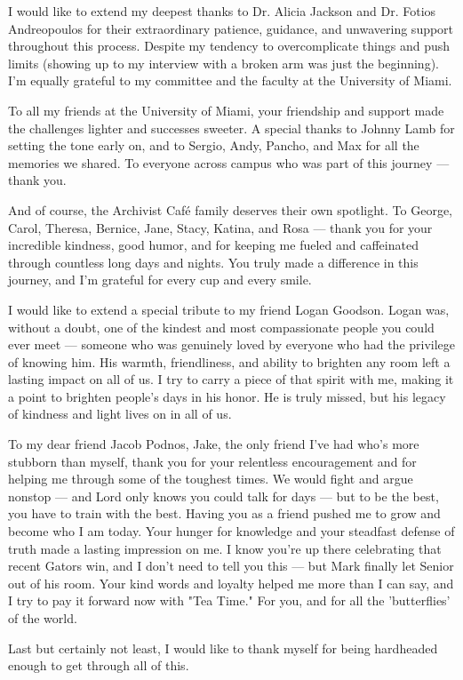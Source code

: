 \begin{dissacknowledgments}
I would like to extend my deepest thanks to Dr. Alicia Jackson and Dr. Fotios Andreopoulos for their extraordinary patience, guidance, and unwavering support throughout this process. Despite my tendency to overcomplicate things and push limits (showing up to my interview with a broken arm was just the beginning). I'm equally grateful to my committee and the faculty at the University of Miami. 
    
To all my friends at the University of Miami, your friendship and support made the challenges lighter and successes sweeter. A special thanks to Johnny Lamb for setting the tone early on, and to Sergio, Andy, Pancho, and Max for all the memories we shared. To everyone across campus who was part of this journey --- thank you.

And of course, the Archivist Café family deserves their own spotlight. To George, Carol, Theresa, Bernice, Jane, Stacy, Katina, and Rosa --- thank you for your incredible kindness, good humor, and for keeping me fueled and caffeinated through countless long days and nights. You truly made a difference in this journey, and I'm grateful for every cup and every smile.

I would like to extend a special tribute to my friend Logan Goodson. Logan was, without a doubt, one of the kindest and most compassionate people you could ever meet --- someone who was genuinely loved by everyone who had the privilege of knowing him. His warmth, friendliness, and ability to brighten any room left a lasting impact on all of us. I try to carry a piece of that spirit with me, making it a point to brighten people's days in his honor. He is truly missed, but his legacy of kindness and light lives on in all of us.

To my dear friend Jacob Podnos, Jake, the only friend I've had who's more stubborn than myself, thank you for your relentless encouragement and for helping me through some of the toughest times. We would fight and argue nonstop --- and Lord only knows you could talk for days --- but to be the best, you have to train with the best. Having you as a friend pushed me to grow and become who I am today. Your hunger for knowledge and your steadfast defense of truth made a lasting impression on me. I know you're up there celebrating that recent Gators win, and I don't need to tell you this --- but Mark finally let Senior out of his room. Your kind words and loyalty helped me more than I can say, and I try to pay it forward now with "Tea Time." For you, and for all the 'butterflies' of the world.

Last but certainly not least, I would like to thank myself for being hardheaded enough to get through all of this.

\vspace{-0.3in}
\end{dissacknowledgments}



